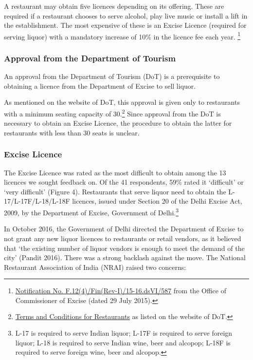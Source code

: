 \documentclass[a4paper, 12pt]{article}
\begin{document}
		A restaurant may obtain five licences depending on its offering. These are required if a restaurant chooses to serve alcohol, play live music or install a lift in the establishment. The most expensive of these is an Excise Licence (required for serving liquor) with a mandatory increase of 10\% in the licence fee each year. \footnote{\href{https://bit.ly/2xoejoG}{Notification No. F.12(4)/Fin(Rev-I)/15-16.dsVI/587} from the Office of Commissioner of Excise (dated 29 July 2015).}
		
		
		\subsubsection{Approval from the Department of Tourism}
		An approval from the Department of Tourism (DoT) is a prerequisite to obtaining a licence from the Department of Excise to sell liquor.
		
		As mentioned on the website of DoT, this approval is given only to restaurants with a minimum seating capacity of 30.\footnote{\href{https://bit.ly/2NMdccI}{Terms and Conditions for Restaurants} as listed on the website of DoT.}  Since approval from the DoT is necessary to obtain an Excise Licence, the procedure to obtain the latter for restaurants with less than 30 seats is unclear. %
		
		
		\subsubsection{Excise Licence}
		The Excise Licence was rated as the most difficult to obtain among the 13 licences we sought feedback on. Of the 41 respondents, 59\% rated it ‘difficult’ or ‘very difficult’ (Figure 4). Restaurants that serve liquor need to obtain the L-17/L-17F/L-18/L-18F licences, issued under Section 20 of the Delhi Excise Act, 2009, by the Department of Excise, Government of Delhi.\footnote{L-17 is required to serve Indian liquor; L-17F is required to serve foreign liquor; L-18 is required to serve Indian wine, beer and alcopop; L-18F is required to serve foreign wine, beer and alcopop.}%
		
		In October 2016, the Government of Delhi directed the Department of Excise to not grant any new liquor licences to restaurants or retail vendors, as it believed that ‘the existing number of liquor vendors is enough to meet the demand of the city’ (Pandit 2016). There was a strong backlash against the move. The National Restaurant Association of India (NRAI) raised two concerns:
		
\end{document}
